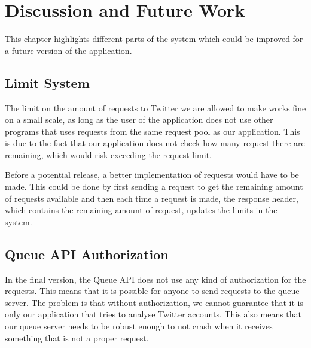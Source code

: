\chapter{Discussion and Future Work}\label{fwork}
This chapter highlights different parts of the system which could
be improved for a future version of the application.

\section*{Limit System}
The limit on the amount of requests to Twitter we are allowed to make works fine
on a small scale, as long as the user of the application does not use other
programs that uses requests from the same request pool as our application. This
is due to the fact that our application does not check how many request there
are remaining, which would risk exceeding the request limit. \nl

Before a potential release, a better implementation of requests would have to be
made. This could be done by first sending a request to get the remaining amount
of requests available and then each time a request is made, the response
header, which contains the remaining amount of request, updates the
limits in the system.\nl


{}

\section*{Queue API Authorization}
In the final version, the Queue API does not use any kind of authorization for
the requests. This means that it is possible for anyone to send requests to the
queue server. The problem is that without authorization, we cannot guarantee
that it is only our application that tries to analyse Twitter accounts. This
also means that our queue server needs to be robust enough to not crash when it
receives something that is not a proper request. \nl

